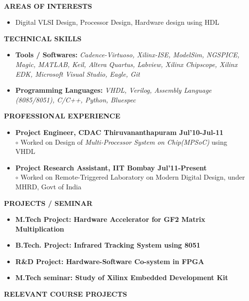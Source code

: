 \documentclass[a4paper,10pt]{article}
\begin{document}
\paragraph{}
\textbf{ }
\vspace{2.1in}

 \hspace{-0.2in}\colorbox{titleColor}{\parbox{6.5in}{\textbf{AREAS OF INTERESTS}}}
 \begin{itemize}
  \setlength{\itemsep}{1pt}
  \item {{  Digital VLSI Design, Processor Design, Hardware design using HDL}}
 \end{itemize}
 \colorbox{titleColor}{\parbox{6.5in}{\textbf{TECHNICAL SKILLS}}}
 \begin{itemize}
  \setlength{\itemsep}{1pt}
  \item \textbf{{Tools / Softwares:}} \textit{Cadence-Virtuoso, Xilinx-ISE, ModelSim, NGSPICE, Magic, MATLAB, Keil, Altera Quartus, Labview, Xilinx Chipscope, Xilinx EDK, Microsoft Visual Studio, Eagle, Git}
  \item \textbf{{Programming Languages:}} \textit{VHDL, Verilog, Assembly Language (8085/8051), C/C++, Python, Bluespec}
 \end{itemize}
  \colorbox{titleColor}{\parbox{6.5in}{\textbf{PROFESSIONAL EXPERIENCE}}}
  \begin{itemize}
  \item \textbf{Project Engineer, CDAC Thiruvananthapuram \qquad\qquad\qquad\quad\qquad\qquad\qquad Jul'10-Jul-11}\\
  $\circ$  Worked on  Design of \textit{Multi-Processor System on Chip(MPSoC)} using VHDL
  \item \textbf{Project Research Assistant, IIT Bombay 	\qquad\qquad\qquad\qquad\quad\qquad\qquad\qquad Jul'11-Present}\\
  $\circ$ Worked on Remote-Triggered Laboratory on Modern Digital Design, under MHRD, Govt of India\\
  \end{itemize}
 \colorbox{titleColor}{\parbox{6.5in}{\textbf{PROJECTS / SEMINAR}}}
 \begin{itemize}
 \item \textbf{M.Tech Project: Hardware Accelerator for GF2 Matrix Multiplication } 
  \item \textbf{{B.Tech. Project: Infrared Tracking System using 8051}}  %
  \item \textbf{{R\&D Project: Hardware-Software Co-system in FPGA}}
  \item \textbf{{M.Tech seminar: Study of Xilinx Embedded Development Kit}}
 \end{itemize}
 \colorbox{titleColor}{\parbox{6.5in}{\textbf{RELEVANT COURSE PROJECTS}}}
\end{document}
